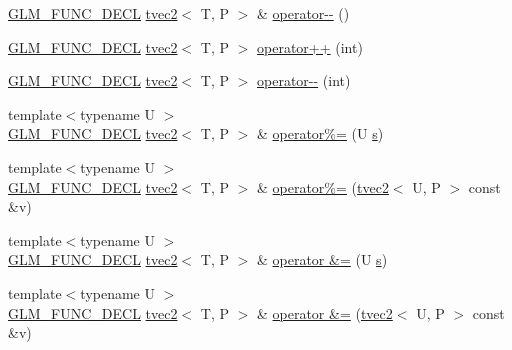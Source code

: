 \begin{DoxyCompactItemize}
\hyperlink{setup_8hpp_ab2d052de21a70539923e9bcbf6e83a51}{G\+L\+M\+\_\+\+F\+U\+N\+C\+\_\+\+D\+E\+CL} \hyperlink{structglm_1_1detail_1_1tvec2}{tvec2}$<$ T, P $>$ \& \hyperlink{structglm_1_1detail_1_1tvec2_a0ce16e6435066b8722def0673e5a63e2}{operator-\/-\/} ()
\item 
\hyperlink{setup_8hpp_ab2d052de21a70539923e9bcbf6e83a51}{G\+L\+M\+\_\+\+F\+U\+N\+C\+\_\+\+D\+E\+CL} \hyperlink{structglm_1_1detail_1_1tvec2}{tvec2}$<$ T, P $>$ \hyperlink{structglm_1_1detail_1_1tvec2_aae07e6b50de77040b6fbbda6a179a5e3}{operator++} (int)
\item 
\hyperlink{setup_8hpp_ab2d052de21a70539923e9bcbf6e83a51}{G\+L\+M\+\_\+\+F\+U\+N\+C\+\_\+\+D\+E\+CL} \hyperlink{structglm_1_1detail_1_1tvec2}{tvec2}$<$ T, P $>$ \hyperlink{structglm_1_1detail_1_1tvec2_a7335fd9b904d01e325117227054f9d93}{operator-\/-\/} (int)
\item 
{\footnotesize template$<$typename U $>$ }\\\hyperlink{setup_8hpp_ab2d052de21a70539923e9bcbf6e83a51}{G\+L\+M\+\_\+\+F\+U\+N\+C\+\_\+\+D\+E\+CL} \hyperlink{structglm_1_1detail_1_1tvec2}{tvec2}$<$ T, P $>$ \& \hyperlink{structglm_1_1detail_1_1tvec2_a1aafefd65ee6be5c33c981f710ef7949}{operator\%=} (U \hyperlink{structglm_1_1detail_1_1tvec2_a6d602cf7c31b75396944d828ad2aea72}{s})
\item 
{\footnotesize template$<$typename U $>$ }\\\hyperlink{setup_8hpp_ab2d052de21a70539923e9bcbf6e83a51}{G\+L\+M\+\_\+\+F\+U\+N\+C\+\_\+\+D\+E\+CL} \hyperlink{structglm_1_1detail_1_1tvec2}{tvec2}$<$ T, P $>$ \& \hyperlink{structglm_1_1detail_1_1tvec2_aef1cf765d277bd24d32a999a353e130b}{operator\%=} (\hyperlink{structglm_1_1detail_1_1tvec2}{tvec2}$<$ U, P $>$ const \&v)
\item 
{\footnotesize template$<$typename U $>$ }\\\hyperlink{setup_8hpp_ab2d052de21a70539923e9bcbf6e83a51}{G\+L\+M\+\_\+\+F\+U\+N\+C\+\_\+\+D\+E\+CL} \hyperlink{structglm_1_1detail_1_1tvec2}{tvec2}$<$ T, P $>$ \& \hyperlink{structglm_1_1detail_1_1tvec2_a8a6e92b5ee416e6a5456c2225de4cb70}{operator \&=} (U \hyperlink{structglm_1_1detail_1_1tvec2_a6d602cf7c31b75396944d828ad2aea72}{s})
\item 
{\footnotesize template$<$typename U $>$ }\\\hyperlink{setup_8hpp_ab2d052de21a70539923e9bcbf6e83a51}{G\+L\+M\+\_\+\+F\+U\+N\+C\+\_\+\+D\+E\+CL} \hyperlink{structglm_1_1detail_1_1tvec2}{tvec2}$<$ T, P $>$ \& \hyperlink{structglm_1_1detail_1_1tvec2_ab7cbf203991c64153248ccb0a011e06e}{operator \&=} (\hyperlink{structglm_1_1detail_1_1tvec2}{tvec2}$<$ U, P $>$ const \&v)

\end{DoxyCompactItemize}
